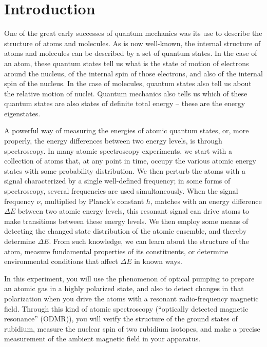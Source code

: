 \documentclass{../lab}
\begin{document}
\maketitle

\tableofcontents

\section{Introduction}

One of the great early successes of quantum mechanics was its use to describe the structure of atoms and molecules.  As is now well-known, the internal structure of atoms and molecules can be described by a set of quantum states.  In the case of an atom, these quantum states tell us what is the state of motion of electrons around the nucleus, of the internal spin of those electrons, and also of the internal spin of the nucleus.  In the case of molecules, quantum states also tell us about the relative motion of nuclei.  Quantum mechanics also tells us which of these quantum states are also states of definite total energy -- these are the energy eigenstates.

A powerful way of measuring the energies of atomic quantum states, or, more properly, the energy differences between two energy levels, is through spectroscopy.  In many atomic spectroscopy experiments, we start with a collection of atoms that, at any point in time, occupy the various atomic energy states with some probability distribution.  We then perturb the atoms with a signal characterized by a single well-defined frequency; in some forms of spectroscopy, several frequencies are used simultaneously.  When the signal frequency $\nu$, multiplied by Planck's constant $h$, matches with an energy difference $\Delta E$ between two atomic energy levels, this resonant signal can drive atoms to make transitions between these energy levels.  We then employ some means of detecting the changed state distribution of the atomic ensemble, and thereby determine $\Delta E$.  From such knowledge, we can learn about the structure of the atom, measure fundamental properties of its constituents, or determine environmental conditions that affect $\Delta E$ in known ways.

In this experiment, you will use the phenomenon of optical pumping to prepare an atomic gas in a highly polarized state, and also to detect changes in that polarization when you drive the atoms with a resonant radio-frequency magnetic field.  Through this kind of atomic spectroscopy (``optically detected magnetic resonance'' (ODMR)), you will verify the structure of the ground states of rubidium, measure the nuclear spin of two rubidium isotopes, and make a precise measurement of the ambient magnetic field in your apparatus.
\end{document}
